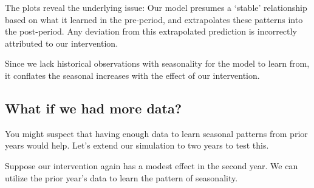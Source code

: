 \documentclass[
  letterpaper,
  DIV=11,
  numbers=noendperiod]{scrreprt}
\begin{document}
The plots reveal the underlying issue: Our model presumes a `stable'
relationship based on what it learned in the pre-period, and
extrapolates these patterns into the post-period. Any deviation from
this extrapolated prediction is incorrectly attributed to our
intervention.

Since we lack historical observations with seasonality for the model to
learn from, it conflates the seasonal increases with the effect of our
intervention.

\subsection{What if we had more data?}\label{what-if-we-had-more-data}

You might suspect that having enough data to learn seasonal patterns
from prior years would help. Let's extend our simulation to two years to
test this.

Suppose our intervention again has a modest effect in the second year.
We can utilize the prior year's data to learn the pattern of
seasonality.
\end{document}
